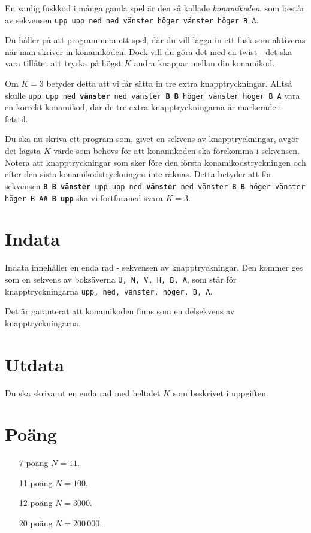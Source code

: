
En vanlig fuskkod i många gamla spel är den så kallade \emph{konamikoden}, som består av sekvensen \texttt{upp upp ned ned vänster höger vänster höger B A}.

Du håller på att programmera ett spel, där du vill lägga in ett fusk som aktiveras när man skriver in konamikoden. Dock vill du göra det med en twist - det ska vara tillåtet att trycka på högst $K$ andra knappar mellan din konamikod.

Om $K = 3$ betyder detta att vi får sätta in tre extra knapptryckningar. Alltså skulle \texttt{upp upp ned \textbf{vänster} ned vänster \textbf{B B} höger vänster höger B A} vara en korrekt konamikod, där de tre extra knapptryckningarna är markerade i fetstil.

Du ska nu skriva ett program som, givet en sekvens av knapptryckningar, avgör det lägsta $K$-värde som behövs för att konamikoden ska förekomma i sekvensen. Notera att knapptryckningar som sker före den första konamikodstryckningen och efter den sista konamikodstryckningen inte räknas. Detta betyder att för sekvensen \texttt{\textbf{B B vänster} upp upp ned \textbf{vänster} ned vänster \textbf{B B} höger vänster höger B A\textbf{A B upp}} ska vi fortfaraned svara $K = 3$.

\section*{Indata}
Indata innehåller en enda rad - sekvensen av knapptryckningar. Den kommer ges som en sekvens av boksäverna \texttt{U, N, V, H, B, A}, som står för knapptryckningarna \texttt{upp, ned, vänster, höger, B, A}.

Det är garanterat att konamikoden finns som en delsekvens av knapptryckningarna.

\section*{Utdata}
Du ska skriva ut en enda rad med heltalet $K$ som beskrivet i uppgiften.

\section*{Poäng}

\begin{enumerate}
	\item[7 poäng] $N = 11$.
	\item[11 poäng] $N = 100$.
	\item[12 poäng] $N = 3000$.
	\item[20 poäng] $N = 200\,000$.
\end{enumerate}
